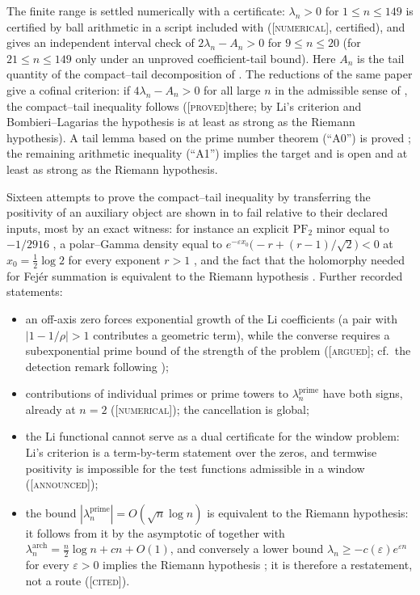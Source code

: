 \documentclass[11pt]{amsart}
\theoremstyle{definition}
\theoremstyle{remark}
\numberwithin{equation}{section}
\newcommand{\stag}[1]{\textsc{[#1]}}
\newcommand{\PROVED}{\stag{proved}}
\newcommand{\CITED}{\stag{cited}}
\newcommand{\ARGUED}{\stag{argued}}
\newcommand{\NUM}{\stag{numerical}}
\newcommand{\ANNOUNCED}{\stag{announced}}
\begin{document}
The finite range is settled numerically with a certificate: $\lambda_n>0$ for $1\le n\le149$ is
certified by ball arithmetic in a script included with \cite{P37} (\NUM, certified), and
\cite[Proposition~9.137]{P36} gives an independent interval check of $2\lambda_n-A_n>0$ for
$9\le n\le20$ (for $21\le n\le149$ only under an unproved coefficient-tail bound). Here $A_n$ is the
tail quantity of the compact--tail decomposition of \cite[Theorem~2.3]{P37}. The reductions of the
same paper give a cofinal criterion: if $4\lambda_n-A_n>0$ for all large $n$ in the admissible
sense of \cite[Theorem~2.10]{P37}, the compact--tail inequality follows (\PROVED there; by Li's
criterion and Bombieri--Lagarias the hypothesis is at least as strong as the Riemann hypothesis).
A tail lemma based on the prime number theorem (``A0'') is proved \cite[Lemma~9.132]{P36}; the
remaining arithmetic inequality (``A1'') implies the target \cite[Corollary~9.136]{P36} and is
open and at least as strong as the Riemann hypothesis.

Sixteen attempts to prove the compact--tail inequality by transferring the positivity of an
auxiliary object are shown in \cite{P37} to fail relative to their declared inputs, most by an
exact witness: for instance an explicit $\mathrm{PF}_2$ minor equal to $-1/2916$
\cite[Theorem~6.1 and Witness~6.1]{P37}, a polar--Gamma density equal to $e^{-\varepsilon x_0}\bigl(-r+(r-1)/\sqrt2\bigr)<0$ at
$x_0=\frac12\log2$ for every exponent $r>1$ \cite[Theorem~12.1]{P37}, and the fact that the holomorphy needed for Fej\'er summation is
equivalent to the Riemann hypothesis \cite[Theorems~8.3 and 8.4]{P37}. Further recorded statements:
\begin{itemize}[leftmargin=2em]
\item an off-axis zero forces exponential growth of the Li coefficients (a pair with $|1-1/\rho|>1$
  contributes a geometric term), while the converse requires a subexponential prime bound of the
  strength of the problem (\ARGUED; cf.\ the detection remark following \cite[Lemma~9.121]{P36});
\item contributions of individual primes or prime towers to $\lambda_n^{\mathrm{prime}}$ have both
  signs, already at $n=2$ (\NUM); the cancellation is global;
\item the Li functional cannot serve as a dual certificate for the window problem: Li's criterion is
  a term-by-term statement over the zeros, and termwise positivity is impossible for the test
  functions admissible in a window (\ANNOUNCED);
\item the bound $|\lambda_n^{\mathrm{prime}}|=O(\sqrt n\log n)$ is equivalent to the Riemann
  hypothesis: it follows from it by the asymptotic of \cite{BombieriLagarias1999} together with
  $\lambda_n^{\mathrm{arch}}=\frac n2\log n+cn+O(1)$, and conversely a lower bound
  $\lambda_n\ge-c(\varepsilon)e^{\varepsilon n}$ for every $\varepsilon>0$ implies the Riemann
  hypothesis \cite{BombieriLagarias1999}; it is therefore a restatement, not a route (\CITED).
\end{itemize}
\end{document}
